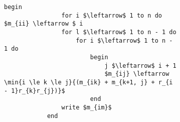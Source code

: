 \documentclass{subfiles}
\begin{document}
\begin{figure}[!h]
    \centering
    \begin{subfigure}[b]{0.6\textwidth}
        \begin{lstlisting}[language = algol]
            begin
                for i $\leftarrow$ 1 to n do $m_{ii} \leftarrow $ i
                for l $\leftarrow$ 1 to n - 1 do
                    for i $\leftarrow$ 1 to n - 1 do
                        begin
                            j $\leftarrow$ i + 1
                            $m_{ij} \leftarrow \min{i \le k \le j}{(m_{ik} + m_{k+1, j} + r_{i - 1}r_{k}r_{j})}$
                        end
                write $m_{im}$
            end
        \end{lstlisting}
    \end{subfigure}
\end{figure}
\end{document}
